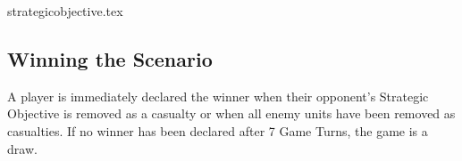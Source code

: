 {strategicobjective.tex}

\subsection*{Winning the Scenario}

A player is immediately declared the winner when their opponent's Strategic Objective is removed as a casualty or when all enemy units have been removed as casualties. If no winner has been declared after 7 Game Turns, the game is a draw.
